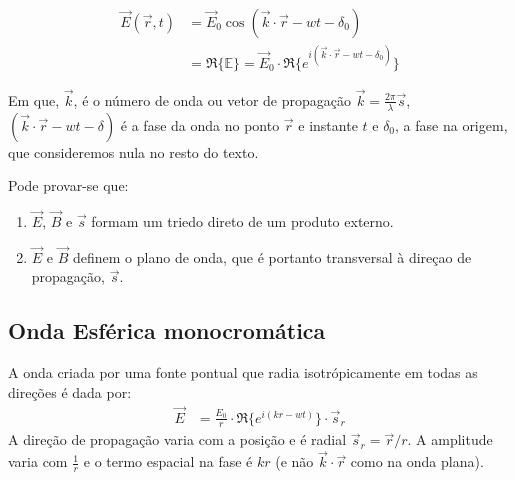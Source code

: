 \documentclass[a4paper,12pt]{article}
\begin{document}
\begin{align}
	\vec{E}(\vec{r}, t) &= \vec{E}_0 \cos(\vec{k} \cdot \vec{r} -wt -\delta_0) \label{eq:1}\\
	&=  \Re \{ \mathbb{E} \} = \vec{E}_0 \cdot \Re \{ e^{ i (\vec{k} \cdot \vec{r} -wt - \delta_0)}\} 
\end{align}

Em que, $\vec{k}$, é o número de onda ou vetor de propagação $\vec{k} =\frac{2 \pi}{\lambda}   \vec{s} $, $(\vec{k} \cdot \vec{r} -wt -\delta)$ é a fase da onda no ponto $\vec{r}$ e instante $t$ e 
$\delta_0$, a fase na origem,  que consideremos nula no resto do texto.

Pode provar-se que: 
\begin{enumerate}
	\item $\vec{E}$, $\vec{B}$ e $\vec{s}$ formam um triedo direto de um produto externo.

	\item $\vec{E}$ e $\vec{B}$ definem o plano de onda, que é portanto transversal à direçao de propagação, $\vec{s}$.

\end{enumerate}


\subsection{\sf Onda Esférica monocromática }
A onda criada por uma fonte pontual que radia isotrópicamente em todas as direções é dada por:
\begin{align}
	\vec{E} &=  \frac{E_{0}}{r} \cdot \Re \{ e^{ i (k r -wt )}\} \cdot \vec{s}_r  \label{eq:odesf0}
\end{align}
A direção de propagação varia com a posição e é radial $\vec{s}_r = \vec{r}/r$. A amplitude varia com $\frac{1}{r}$ e o termo espacial na fase é $k r$ (e não $ \vec{k} \cdot \vec{r} $ como na onda plana). 
\end{document}
